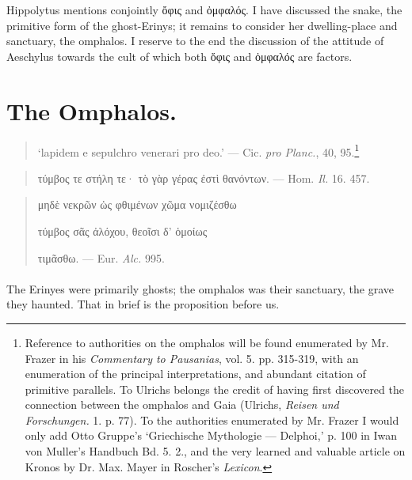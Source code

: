 \documentclass[a4paper, 11pt, oneside, polutonikogreek, english]{article}
\begin{document}
Hippolytus mentions conjointly ὄφις and ὀμφαλός. I have discussed the snake, the primitive form of the ghost-Erinys; it remains to consider her dwelling-place and sanctuary, the omphalos. I reserve to the end the discussion of the attitude of Aeschylus towards the cult of which both ὄφις and ὀμφαλός are factors.
\clearpage
\section{The Omphalos.}
\begin{quotation}
\large
`lapidem e sepulchro venerari pro deo.' --- Cic. \emph{pro Planc.}, 40, 95.\footnote{Reference to authorities on the omphalos will be found enumerated by Mr. Frazer in his \emph{Commentary to Pausanias}, vol. 5. pp. 315-319, with an enumeration of the principal interpretations, and abundant citation of primitive parallels. To Ulrichs belongs the credit of having first discovered the connection between the omphalos and Gaia (Ulrichs, \emph{Reisen und Forschungen.} 1. p. 77). To the authorities enumerated by Mr. Frazer I would only add Otto Gruppe's `Griechische Mythologie --- Delphoi,' p. 100 in Iwan von Muller's Handbuch Bd. 5. 2., and the very learned and valuable article on Kronos by Dr. Max. Mayer in Roscher's \emph{Lexicon}.}
\end{quotation}
\begin{quotation}
\large
τύμβος τε στήλη τε· τὸ γὰρ γέρας ἐστὶ θανόντων. --- Hom. \emph{Il.} 16. 457.
\end{quotation}
\begin{quotation}
\large
μηδὲ νεκρῶν ὡς φθιμένων χῶμα νομιζέσθω

τύμβος σᾶς ἀλόχου, θεοῖσι δ' ὁμοίως

\hspace*{5mm}τιμᾶσθω. --- Eur. \emph{Alc.} 995. 
\end{quotation}
\paragraph{}
The Erinyes were primarily ghosts; the omphalos was their sanctuary, the grave they haunted. That in brief is the proposition before us.
\end{document}
